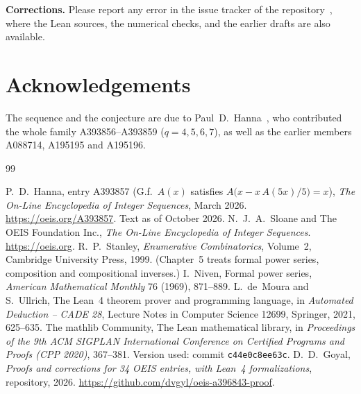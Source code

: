 \documentclass[11pt,a4paper]{article}
\theoremstyle{definition}
\theoremstyle{remark}
\newcommand{\para}[1]{\par\medskip\noindent\textbf{#1}\enspace}
\begin{document}
\para{Corrections.} Please report any error in the issue tracker of the repository~\cite{repo}, where the Lean
sources, the numerical checks, and the earlier drafts are also available.

\section*{Acknowledgements}
The sequence and the conjecture are due to Paul~D.~Hanna~\cite{oeis}, who contributed
the whole family A393856--A393859 ($q=4,5,6,7$), as well as the earlier members A088714, A195195 and A195196.

\begin{thebibliography}{99}\small
\raggedright
{} P.~D.~Hanna, entry A393857 (G.f.\ $A(x)$ satisfies $A\bigl(x-x\,A(5x)/5\bigr)=x$), \emph{The On-Line Encyclopedia of Integer Sequences}, March 2026. \url{https://oeis.org/A393857}. Text as of October 2026.
 N.~J.~A.~Sloane and The OEIS Foundation Inc., \emph{The On-Line Encyclopedia of Integer Sequences}. \url{https://oeis.org}.
 R.~P.~Stanley, \emph{Enumerative Combinatorics}, Volume~2, Cambridge University Press, 1999. (Chapter~5 treats formal power series, composition and compositional inverses.)
 I.~Niven, Formal power series, \emph{American Mathematical Monthly} 76 (1969), 871--889.
 L.~de~Moura and S.~Ullrich, The Lean~4 theorem prover and programming language, in \emph{Automated Deduction -- CADE 28}, Lecture Notes in Computer Science 12699, Springer, 2021, 625--635.
 The mathlib Community, The Lean mathematical library, in \emph{Proceedings of the 9th ACM SIGPLAN International Conference on Certified Programs and Proofs (CPP 2020)}, 367--381. Version used: commit \texttt{c44e0c8ee63c}.
 D.~D.~Goyal, \emph{Proofs and corrections for 34 OEIS entries, with Lean~4 formalizations}, repository, 2026. \url{https://github.com/dvgyl/oeis-a396843-proof}.
\end{thebibliography}
\end{document}
